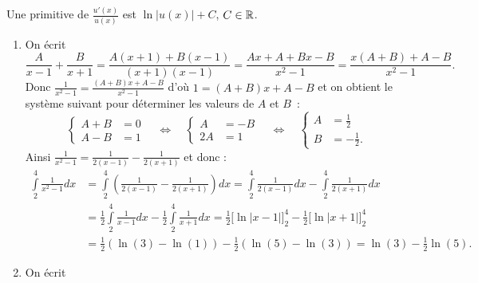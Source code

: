 \documentclass[11pt,class=report,crop=false]{standalone}
\begin{document}
\indication
Une primitive de $ \frac{u'(x)}{u(x)} $ est $ \ln|u(x)| + C $, $ C \in \mathbb{R} $. 
\finindication

\correction


\sauteligne
\begin{enumerate} 
	\item 
	On écrit 
	\begin{equation*} 
		\frac{A}{x-1}+\frac{B}{x+1} = \frac{A(x+1)+B(x-1)}{(x+1)(x-1)} = 
		\frac{Ax + A + Bx - B}{x^2 - 1} = \frac{x(A+B) + A - B}{x^2 - 1}. 
	\end{equation*} 
	Donc $ \frac{1}{x^{2}-1} = \frac{(A+B)x + A - B}{x^2 - 1} $ d'où 
	$ 1 = (A+B)x + A - B $ et on obtient le système suivant pour déterminer 
	les valeurs de $ A $ et $ B $~: 
	\begin{equation*} 
		\begin{cases} 
			A + B &= 0 \\ 
			A - B &= 1 
		\end{cases} 
		\quad \Longleftrightarrow \quad 
		\begin{cases} 
			A  &= -B \\ 
			2A &= 1 
		\end{cases} 
		\quad \Longleftrightarrow \quad 
		\begin{cases} 
			A &= \frac{1}{2} \\ 
			B &= -\frac{1}{2}. 
		\end{cases} 
	\end{equation*} 
	Ainsi $ \frac{1}{x^{2}-1} = \frac{1}{2(x-1)}-\frac{1}{2(x+1)} $ et donc : 
	\begin{equation*} 
		\begin{split} 
			\int \limits _{2} ^{4} \frac{1}{x^{2}-1} dx 
			&= 
			\int \limits _{2} ^{4} \left(\frac{1}{2(x-1)}-\frac{1}{2(x+1)}\right) dx 
			= 
			\int \limits _{2} ^{4} \frac{1}{2(x-1)} dx 
			- \int \limits _{2} ^{4} \frac{1}{2(x+1)} dx \\ 
			&= 
			\frac{1}{2} \int \limits _{2} ^{4} \frac{1}{x-1} dx 
			- \frac{1}{2} \int \limits _{2} ^{4} \frac{1}{x+1} dx 
			= 
			\frac{1}{2} \big[\ln|x-1|\big]_2^4 
			-\frac{1}{2} \big[\ln|x+1|\big]_2^4 \\ 
			&= 
			\frac{1}{2} \left(\ln(3) - \ln(1)\right)  
			-\frac{1}{2} \left(\ln(5) - \ln(3)\right) 
			= 
			\ln(3) - \frac{1}{2} \ln(5). 
		\end{split} 
	\end{equation*} 
	\item 
	On écrit 

\end{enumerate}
\end{document}
